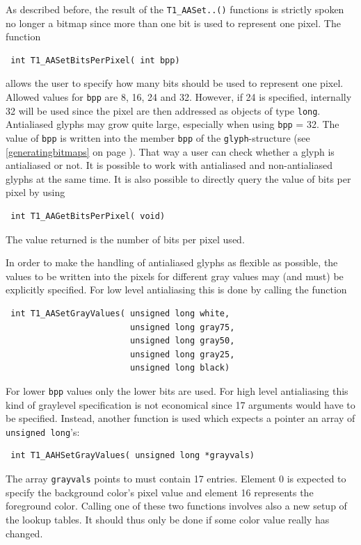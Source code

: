 As described before, the result of the \verb+T1_AASet..()+ functions is 
strictly spoken no longer a
bitmap since more than one bit is used to
represent one pixel. The function
\precorr
\begin{verbatim}
 int T1_AASetBitsPerPixel( int bpp)
\end{verbatim}\postcorr
allows the user to specify how many bits should be used to represent one
pixel. Allowed values for \verb+bpp+ are 8, 16, 24 and 32. However, if 24 is
specified, internally 32 will be used since the pixel are then addressed as
objects of type \verb+long+. Antialiased glyphs may grow quite large,
especially when 
using \verb+bpp+ = 32. The value of \verb+bpp+ is written into the member
\verb+bpp+ of the \verb+glyph+-structure (see \ref{generatingbitmaps} on page
\pageref{generatingbitmaps}).  That way a user can check whether a
glyph is antialiased or not. It is possible to work with antialiased
and non-antialiased glyphs at the same time.
It is also possible to directly query the value of bits per pixel by using
\precorr
\begin{verbatim}
 int T1_AAGetBitsPerPixel( void)
\end{verbatim}\postcorr
The value returned is the number of bits per pixel used.

In order to make the handling of antialiased glyphs as flexible as possible,
the values to be written into the pixels for different gray values
may (and must) be explicitly specified. For low level antialiasing this is
done by calling the function
\precorr
\begin{verbatim}
 int T1_AASetGrayValues( unsigned long white,
                         unsigned long gray75,
                         unsigned long gray50,
                         unsigned long gray25,
                         unsigned long black)
\end{verbatim}\postcorr
For lower \verb+bpp+ values only the lower bits are used. For high level
antialiasing this kind of graylevel specification is not economical since 17
arguments 
would have to be specified. Instead, another function is used which expects a
pointer an array of \verb+unsigned long+'s:
\precorr
\begin{verbatim}
 int T1_AAHSetGrayValues( unsigned long *grayvals)
\end{verbatim}\postcorr
The array \verb+grayvals+ points to must contain 17 entries. Element 0 is
expected to specify the background color's pixel value and element 16
represents the foreground color. Calling one of these two functions involves
also a new setup of the lookup tables. It should thus only be done if some
color value really has changed. 

